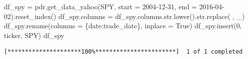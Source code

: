 \documentclass[
  letterpaper,
  DIV=11,
  numbers=noendperiod]{scrreprt}
\newenvironment{Shaded}{\begin{snugshade}}{\end{snugshade}}
\newcommand{\BuiltInTok}[1]{\textcolor[rgb]{0.00,0.23,0.31}{#1}}
\newcommand{\DecValTok}[1]{\textcolor[rgb]{0.68,0.00,0.00}{#1}}
\newcommand{\NormalTok}[1]{\textcolor[rgb]{0.00,0.23,0.31}{#1}}
\newcommand{\OperatorTok}[1]{\textcolor[rgb]{0.37,0.37,0.37}{#1}}
\newcommand{\StringTok}[1]{\textcolor[rgb]{0.13,0.47,0.30}{#1}}
\newcommand{\VariableTok}[1]{\textcolor[rgb]{0.07,0.07,0.07}{#1}}
\begin{document}
\begin{Shaded}
\begin{Highlighting}[]
\NormalTok{df\_spy }\OperatorTok{=}\NormalTok{ pdr.get\_data\_yahoo(}\StringTok{\textquotesingle{}SPY\textquotesingle{}}\NormalTok{, start }\OperatorTok{=} \StringTok{\textquotesingle{}2004{-}12{-}31\textquotesingle{}}\NormalTok{, end }\OperatorTok{=} \StringTok{\textquotesingle{}2016{-}04{-}02\textquotesingle{}}\NormalTok{).reset\_index()}
\NormalTok{df\_spy.columns }\OperatorTok{=}\NormalTok{ df\_spy.columns.}\BuiltInTok{str}\NormalTok{.lower().}\BuiltInTok{str}\NormalTok{.replace(}\StringTok{\textquotesingle{} \textquotesingle{}}\NormalTok{, }\StringTok{\textquotesingle{}\_\textquotesingle{}}\NormalTok{)}
\NormalTok{df\_spy.rename(columns }\OperatorTok{=}\NormalTok{ \{}\StringTok{\textquotesingle{}date\textquotesingle{}}\NormalTok{:}\StringTok{\textquotesingle{}trade\_date\textquotesingle{}}\NormalTok{\}, inplace }\OperatorTok{=} \VariableTok{True}\NormalTok{)}
\NormalTok{df\_spy.insert(}\DecValTok{0}\NormalTok{, }\StringTok{\textquotesingle{}ticker\textquotesingle{}}\NormalTok{, }\StringTok{\textquotesingle{}SPY\textquotesingle{}}\NormalTok{)}
\NormalTok{df\_spy}
\end{Highlighting}
\end{Shaded}

\begin{verbatim}
[*********************100%***********************]  1 of 1 completed
\end{verbatim}
\end{document}
